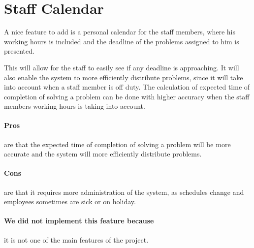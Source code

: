 \section{Staff Calendar}
\label{sec:staffCalendar}
A nice feature to add is a personal calendar for the staff members, where his working hours is included and the deadline of the problems assigned to him is presented. 

This will allow for the staff to easily see if any deadline is approaching. 
It will also enable the system to more efficiently distribute problems, since it will take into account when a staff member is off duty. 
The calculation of expected time of completion of solving a problem can be done with higher accuracy when the staff members working hours is taking into account. 

\paragraph{Pros} are that the expected time of completion of solving a problem will be more accurate and the system will more efficiently distribute problems.
\paragraph{Cons} are that it requires more administration of the system, as schedules change and employees sometimes are sick or on holiday.
\paragraph{We did not implement this feature because} it is not one of the main features of the project.